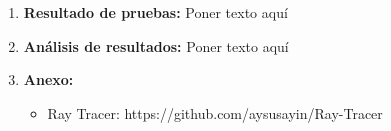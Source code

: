 \documentclass[12pt, letterpaper]{article}
\begin{document}
\begin{flushleft}
\begin{enumerate}
        \vspace{10mm}
        \item \textbf{Resultado de pruebas:}
        Poner texto aquí
        \item \textbf{Análisis de resultados:}
        Poner texto aquí
        \item \textbf{Anexo:}
        \begin{itemize}
            \item Ray Tracer: https://github.com/aysusayin/Ray-Tracer
        \end{itemize}
    \end{enumerate}
\end{flushleft}
\end{document}
